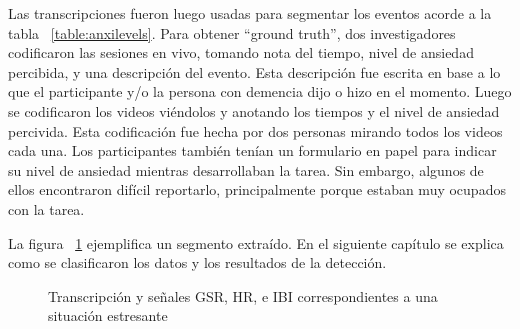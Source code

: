 Las transcripciones fueron luego usadas para segmentar los eventos acorde a la tabla ~\ref{table:anxilevels}.
Para obtener ``ground truth'', dos investigadores codificaron las sesiones en vivo, tomando nota del tiempo, nivel de ansiedad percibida, y una descripci\'on del evento. Esta descripci\'on fue escrita en base a lo que el participante y/o la persona con demencia dijo o hizo en el momento. Luego se codificaron los videos vi\'endolos y anotando los tiempos y el nivel de ansiedad percivida. Esta codificaci\'on fue hecha por dos personas mirando todos los videos cada una. Los participantes tambi\'en ten\'ian un formulario en papel para indicar su nivel de ansiedad mientras desarrollaban la tarea. Sin embargo, algunos de ellos encontraron dif\'icil reportarlo, principalmente porque estaban muy ocupados con la tarea.


La figura ~\ref{fig:imgsegment} ejemplifica un segmento extra\'ido. En el siguiente cap\'itulo se explica como se clasificaron los datos y los resultados de la detecci\'on.

\begin{figure}[h]
        \centering
        \caption{Transcripci\'on y se\~nales GSR, HR, e IBI correspondientes a una situaci\'on estresante}\label{fig:imgsegment}
\end{figure}
